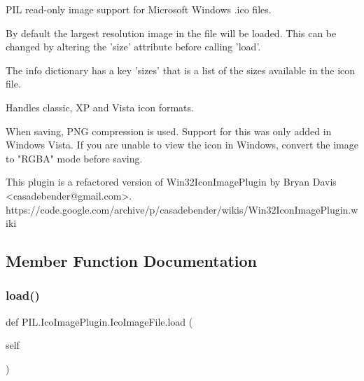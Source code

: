 \begin{DoxyVerb}PIL read-only image support for Microsoft Windows .ico files.

By default the largest resolution image in the file will be loaded. This
can be changed by altering the 'size' attribute before calling 'load'.

The info dictionary has a key 'sizes' that is a list of the sizes available
in the icon file.

Handles classic, XP and Vista icon formats.

When saving, PNG compression is used. Support for this was only added in
Windows Vista. If you are unable to view the icon in Windows, convert the
image to "RGBA" mode before saving.

This plugin is a refactored version of Win32IconImagePlugin by Bryan Davis
<casadebender@gmail.com>.
https://code.google.com/archive/p/casadebender/wikis/Win32IconImagePlugin.wiki
\end{DoxyVerb}
 

\subsection{Member Function Documentation}
\mbox{\label{classPIL_1_1IcoImagePlugin_1_1IcoImageFile_af6e37185ed8c54192b414eeed5d6a734}} 
\subsubsection{\texorpdfstring{load()}{load()}}
{\footnotesize\ttfamily def P\+I\+L.\+Ico\+Image\+Plugin.\+Ico\+Image\+File.\+load (\begin{DoxyParamCaption}\item[{}]{self }\end{DoxyParamCaption})}

\mbox{\label{classPIL_1_1IcoImagePlugin_1_1IcoImageFile_a0c90ca26415ff9316d6e4394551d6af2}} 

